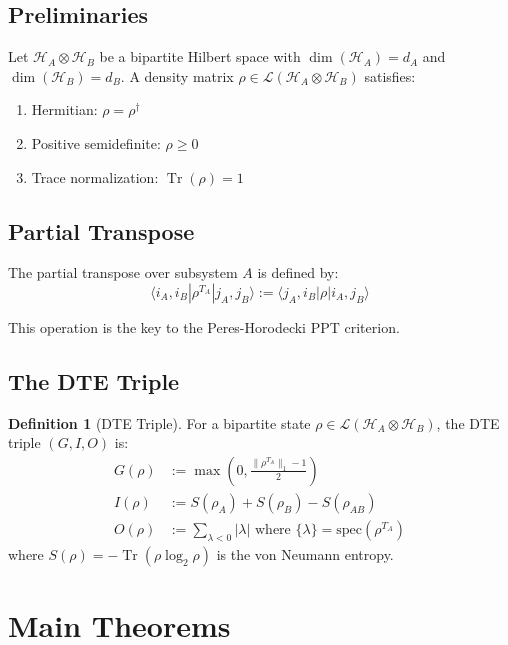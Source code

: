 \documentclass[11pt,a4paper]{article}
\theoremstyle{definition}
\newtheorem{definition}[theorem]{Definition}
\begin{document}
\subsection{Preliminaries}

Let $\mathcal{H}_A \otimes \mathcal{H}_B$ be a bipartite Hilbert space with $\dim(\mathcal{H}_A) = d_A$ and $\dim(\mathcal{H}_B) = d_B$. A density matrix $\rho \in \mathcal{L}(\mathcal{H}_A \otimes \mathcal{H}_B)$ satisfies:
\begin{enumerate}
    \item Hermitian: $\rho = \rho^\dagger$
    \item Positive semidefinite: $\rho \geq 0$
    \item Trace normalization: $\operatorname{Tr}(\rho) = 1$
\end{enumerate}

\subsection{Partial Transpose}

The partial transpose over subsystem $A$ is defined by:
\begin{equation}
    \langle i_A, i_B | \rho^{T_A} | j_A, j_B \rangle := \langle j_A, i_B | \rho | i_A, j_B \rangle
\end{equation}

This operation is the key to the Peres-Horodecki PPT criterion.

\subsection{The DTE Triple}

\begin{definition}[DTE Triple]
For a bipartite state $\rho \in \mathcal{L}(\mathcal{H}_A \otimes \mathcal{H}_B)$, the DTE triple $(G, I, O)$ is:
\begin{align}
    G(\rho) &:= \max\left(0, \frac{\|\rho^{T_A}\|_1 - 1}{2}\right) \\
    I(\rho) &:= S(\rho_A) + S(\rho_B) - S(\rho_{AB}) \\
    O(\rho) &:= \sum_{\lambda < 0} |\lambda| \text{ where } \{\lambda\} = \text{spec}(\rho^{T_A})
\end{align}
where $S(\rho) = -\operatorname{Tr}(\rho \log_2 \rho)$ is the von Neumann entropy.
\end{definition}

\section{Main Theorems}
\end{document}
